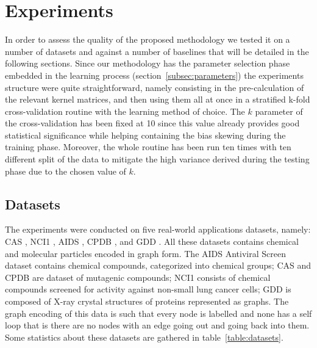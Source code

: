 
\chapter{Experiments}
\label{Chapter4}

In order to assess the quality of the proposed methodology we tested it on a
number of datasets and against a number of baselines that will be detailed in
the following sections.
Since our methodology has the parameter selection phase embedded in the learning
process (section~\ref{subsec:parameters}) the experiments structure were quite
straightforward, namely consisting in the pre-calculation of the relevant kernel
matrices, and then using them all at once in a stratified k-fold cross-validation
routine with the learning method of choice.
The $k$ parameter of the cross-validation has been fixed at 10 since this value
already provides good statistical significance while helping containing the bias
skewing during the training phase.
Moreover, the whole routine has been run ten times with ten different split of the
data to mitigate the high variance derived during the testing phase due to the
chosen value of $k$.

\section{Datasets}
\label{subsec:datasets}

The experiments were conducted on five real-world applications datasets, namely:
CAS \cite{cas}, NCI1 \cite{nci1}, AIDS \cite{aids}, CPDB \cite{cpdb}, and GDD \cite{gdd}.
All these datasets contains chemical and molecular particles encoded in graph form.
The AIDS Antiviral Screen dataset contains chemical compounds, categorized
into chemical groups; CAS and CPDB are dataset of mutagenic
compounds; NCI1 consists of chemical compounds screened for activity against 
non-small lung cancer cells; GDD is composed of X-ray crystal structures of
proteins represented as graphs.
The graph encoding of this data is such that every node is labelled and none
has a self loop that is there are no nodes with an edge going out and going back
into them.
Some statistics about these datasets are gathered in table~\ref{table:datasets}.

